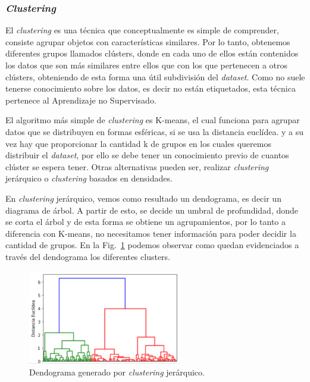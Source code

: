 \documentclass[a4paper,12pt]{article}
\begin{document}
\subsubsection{\textit{Clustering}}

El \textit{clustering} es una técnica que conceptualmente es simple de comprender, consiste agrupar objetos con características similares. Por lo tanto, obtenemos diferentes grupos llamados clústers, donde en cada uno de ellos están contenidos los datos que son más similares entre ellos que con los que pertenecen a otros clústers, obteniendo de esta forma una útil subdivisión del \textit{dataset}. Como no suele tenerse conocimiento sobre los datos, es decir no están etiquetados, esta técnica pertenece al Aprendizaje no Supervisado.

\clearpage

El algoritmo más simple de \textit{clustering} es K-means, el cual funciona para agrupar datos que se distribuyen en formas esféricas, si se usa la distancia euclídea. y a su vez hay que proporcionar la cantidad k de grupos en los cuales queremos distribuir el \textit{dataset}, por ello se debe tener un conocimiento previo de cuantos clúster se espera tener. 
Otras alternativas pueden ser, realizar \textit{clustering} jerárquico o \textit{clustering} basados en densidades.

En \textit{clustering} jerárquico, vemos como resultado un dendograma, es decir un diagrama de árbol. A partir de esto, se decide un umbral de profundidad, donde se corta el árbol y  de esta forma se obtiene un agrupamientos, por lo tanto a diferencia con K-means, no necesitamos tener información para poder decidir la cantidad de grupos. En la Fig.~\ref{fig:dendogram.} podemos observar como quedan evidenciados a través del dendograma los diferentes clusters.

\begin{figure}[H]
	\begin{center}				
	\includegraphics[width=0.6\textwidth]{tesis_16.png}
  	\caption{Dendograma generado por \textit{clustering} jerárquico.}
  	\label{fig:dendogram.}
  	\end{center}
\end{figure}
\end{document}
